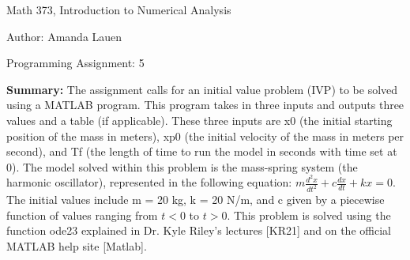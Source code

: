 \documentclass{article}
\begin{document}

\large

{\Large Math 373, Introduction to Numerical Analysis}

\begin{center}
{\Large Author: \hfill Amanda Lauen} %
\end{center}
\par \medskip \par
{\Large Programming Assignment: 5} 
\par \bigskip \par

{\bf Summary:} {\color{black} The assignment calls for an initial value problem (IVP) to be solved using a MATLAB program.  This program takes in three inputs and outputs three values and a table (if applicable).  These three inputs are x0 (the initial starting position of the mass in meters), xp0 (the initial velocity of the mass in meters per second), and Tf (the length of time to run the model in seconds with time set at 0).  The model solved within this problem is the mass-spring system (the harmonic oscillator), represented in the following equation: $m\frac{d^2 x}{dt^2}+c\frac{dx}{dt}+kx=0$.  The initial values include m = 20 kg, k = 20 N/m, and c given by a piecewise function of values ranging from $t < 0$ to $t > 0$.  This problem is solved using the function ode23 explained in Dr. Kyle Riley’s lectures [KR21] and on the official MATLAB help site [Matlab].} 
\par \bigskip \par
\end{document}
